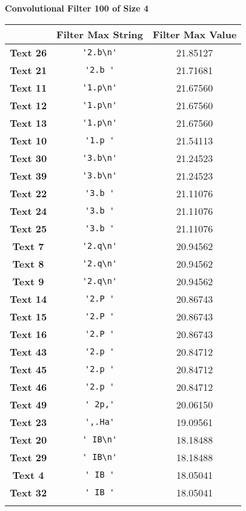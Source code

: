 \textbf{Convolutional Filter 100 of Size 4}\par\medskip
\begin{tabular}{c|cc}
    & \textbf{Filter Max String} & \textbf{Filter Max Value} \\ \hline
    \textbf{Text 26} & \verb{'2.b\n'{ & 21.85127 \\
    \textbf{Text 21} & \verb{'2.b '{ & 21.71681 \\
    \textbf{Text 11} & \verb{'1.p\n'{ & 21.67560 \\
    \textbf{Text 12} & \verb{'1.p\n'{ & 21.67560 \\
    \textbf{Text 13} & \verb{'1.p\n'{ & 21.67560 \\
    \textbf{Text 10} & \verb{'1.p '{ & 21.54113 \\
    \textbf{Text 30} & \verb{'3.b\n'{ & 21.24523 \\
    \textbf{Text 39} & \verb{'3.b\n'{ & 21.24523 \\
    \textbf{Text 22} & \verb{'3.b '{ & 21.11076 \\
    \textbf{Text 24} & \verb{'3.b '{ & 21.11076 \\
    \textbf{Text 25} & \verb{'3.b '{ & 21.11076 \\
    \textbf{Text 7} & \verb{'2.q\n'{ & 20.94562 \\
    \textbf{Text 8} & \verb{'2.q\n'{ & 20.94562 \\
    \textbf{Text 9} & \verb{'2.q\n'{ & 20.94562 \\
    \textbf{Text 14} & \verb{'2.P '{ & 20.86743 \\
    \textbf{Text 15} & \verb{'2.P '{ & 20.86743 \\
    \textbf{Text 16} & \verb{'2.P '{ & 20.86743 \\
    \textbf{Text 43} & \verb{'2.p '{ & 20.84712 \\
    \textbf{Text 45} & \verb{'2.p '{ & 20.84712 \\
    \textbf{Text 46} & \verb{'2.p '{ & 20.84712 \\
    \textbf{Text 49} & \verb{' 2p,'{ & 20.06150 \\
    \textbf{Text 23} & \verb{',.Ha'{ & 19.09561 \\
    \textbf{Text 20} & \verb{' IB\n'{ & 18.18488 \\
    \textbf{Text 29} & \verb{' IB\n'{ & 18.18488 \\
    \textbf{Text 4} & \verb{' IB '{ & 18.05041 \\
    \textbf{Text 32} & \verb{' IB '{ & 18.05041 \\
}}}}}}}}}}}}}}}}}}}}}}}}}}
\end{tabular}
